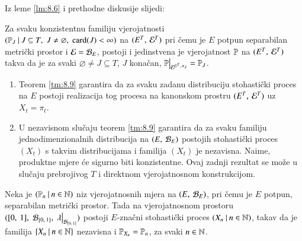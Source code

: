 Iz leme \ref{lm:8.6} i prethodne diskusije slijedi:

\begin{tm}[Kolmogorov]    \label{tm:8.9}
    Za svaku konzistentnu familiju vjerojatnosti\\
    $({\mathbb{P}_J} \: | \: {J \subseteq T, \; J \neq \varnothing, \; \textnormal{card}({J}) < \infty})$ na $({E^T}, \: {\mathcal{E}^T})$ pri \v cemu je $E$ potpun separabilan metri\v cki prostor i $\mathcal{E} = \mathcal{B}_{E}$, postoji i jedinstvena je vjerojatnost $\mathbb{P}$ na $({E^T}, \: {\mathcal{E}^T})$ takva da je za svaki $\varnothing \neq J \subseteq T$, $J$ kona\v can, $\restr{\masP}{\famE^{\famE^T, \: \pi_J}} = \masP_J$.
\end{tm}

\begin{nap} \label{nap:8.10}
    \begin{enumerate}[label=(\alph*)]
        \item Teorem \ref{tm:8.9} garantira da za svaku zadanu distribuciju stohasti\v cki proces na $E$ postoji realizacija tog procesa na kanonskom prostru $({E^T}, \: {\mathcal{E}^T})$ uz $X_t = \pi_t$.
        \item U nezavisnom slu\v caju teorem \ref{tm:8.9} garantira da za svaku familiju jednodimenzionalnih distribucija na $({E}, \: {\mathcal{B}_{E}})$ postojih stohasti\v cki proces $(X_t)$ s takvim distribucijama i familija $(X_t)$ je nezavisna.
        Naime, produktne mjere \' ce sigurno biti konzistentne.
        Ovaj zadnji rezultat se mo\v ze u slu\v caju prebrojivog $T$ i direktnom vjerojatnosnom konstrukcijom.
    \end{enumerate}
\end{nap}

\begin{tm}  \label{tm:8.11}
    Neka je $({\mathbb{P}_n} \: | \: {n \in \mathbb{N}})$ niz vjerojatnosnih mjera na $({E}, \: {\mathcal{B}_{E}})$, pri \v cemu je $E$ potpun, separabilan metri\v cki prostor.
    Tada na vjerojatnosnom prostoru $(\segment{0}{1}, \; \borel{\segment{0}{1}}, \; \restr{\lambda}{\borel{\segment{0}{1}}})$ postoji $E$-zna\v cni stohasti\v cki proces $({X_n} \: | \: {n \in \mathbb{N}})$, takav da je familija $\{{X_n} \: | \: {n \in \mathbb{N}}\}$ nezavisna i $\mathbb{P}_{X_n} = \mathbb{P}_n$, za svaki $n \in \mathbb{N}$.
\end{tm}

